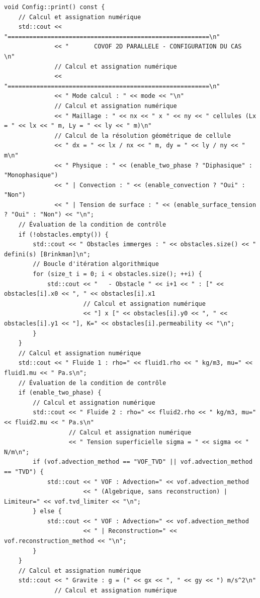 \documentclass[10pt,a4paper,oneside]{book}
\begin{document}
\begin{lstlisting}[language={[11]C++}]
void Config::print() const {
    // Calcul et assignation numérique
    std::cout << "========================================================\n"
              << "       COVOF 2D PARALLELE - CONFIGURATION DU CAS         \n"
              // Calcul et assignation numérique
              << "========================================================\n"
              << " Mode calcul : " << mode << "\n"
              // Calcul et assignation numérique
              << " Maillage : " << nx << " x " << ny << " cellules (Lx = " << lx << " m, Ly = " << ly << " m)\n"
              // Calcul de la résolution géométrique de cellule
              << " dx = " << lx / nx << " m, dy = " << ly / ny << " m\n"
              << " Physique : " << (enable_two_phase ? "Diphasique" : "Monophasique")
              << " | Convection : " << (enable_convection ? "Oui" : "Non")
              << " | Tension de surface : " << (enable_surface_tension ? "Oui" : "Non") << "\n";
    // Évaluation de la condition de contrôle
    if (!obstacles.empty()) {
        std::cout << " Obstacles immerges : " << obstacles.size() << " defini(s) [Brinkman]\n";
        // Boucle d'itération algorithmique
        for (size_t i = 0; i < obstacles.size(); ++i) {
            std::cout << "   - Obstacle " << i+1 << " : [" << obstacles[i].x0 << ", " << obstacles[i].x1
                      // Calcul et assignation numérique
                      << "] x [" << obstacles[i].y0 << ", " << obstacles[i].y1 << "], K=" << obstacles[i].permeability << "\n";
        }
    }
    // Calcul et assignation numérique
    std::cout << " Fluide 1 : rho=" << fluid1.rho << " kg/m3, mu=" << fluid1.mu << " Pa.s\n";
    // Évaluation de la condition de contrôle
    if (enable_two_phase) {
        // Calcul et assignation numérique
        std::cout << " Fluide 2 : rho=" << fluid2.rho << " kg/m3, mu=" << fluid2.mu << " Pa.s\n"
                  // Calcul et assignation numérique
                  << " Tension superficielle sigma = " << sigma << " N/m\n";
        if (vof.advection_method == "VOF_TVD" || vof.advection_method == "TVD") {
            std::cout << " VOF : Advection=" << vof.advection_method
                      << " (Algebrique, sans reconstruction) | Limiteur=" << vof.tvd_limiter << "\n";
        } else {
            std::cout << " VOF : Advection=" << vof.advection_method
                      << " | Reconstruction=" << vof.reconstruction_method << "\n";
        }
    }
    // Calcul et assignation numérique
    std::cout << " Gravite : g = (" << gx << ", " << gy << ") m/s^2\n"
              // Calcul et assignation numérique

\end{lstlisting}
\end{document}
